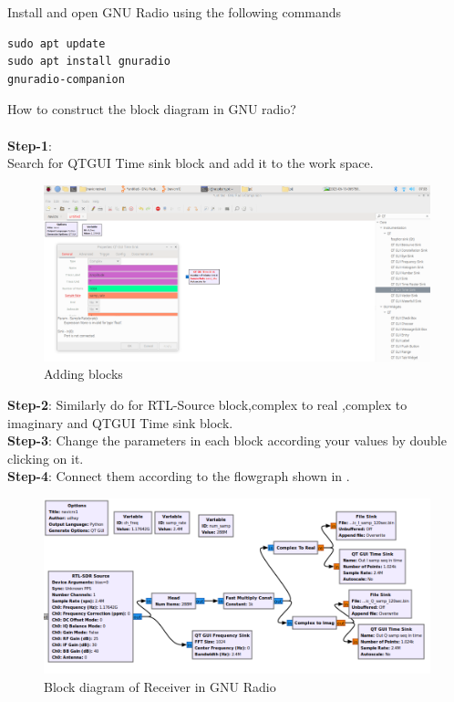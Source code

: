  Install and open GNU Radio using the following commands
\\
\begin{lstlisting}
sudo apt update
sudo apt install gnuradio
gnuradio-companion
\end{lstlisting}
 How to construct the block diagram in GNU radio? \\
	\solution  \\
\textbf{Step-1}:\\
Search for QTGUI Time sink  block and add it to the work space.
\begin{figure}[ht]
\centering
\includegraphics[width=\columnwidth]{figs/add.png}
\caption{Adding blocks}
\label{fig:add blocks}
\end{figure}
\textbf{Step-2}:
Similarly do for RTL-Source block,complex to real ,complex to imaginary and QTGUI Time sink block.
\\
\textbf{Step-3}:
Change the parameters in each block according your values by double clicking on it.
\\
\textbf{Step-4}:
Connect them according to the flowgraph shown in .
\begin{figure}[ht]
\centering
\includegraphics[width=\columnwidth]{figs/RTL_SDR_test.png}
\caption{Block diagram of Receiver in GNU Radio}
\label{fig:Rx_Block_diagram}
\end{figure}
